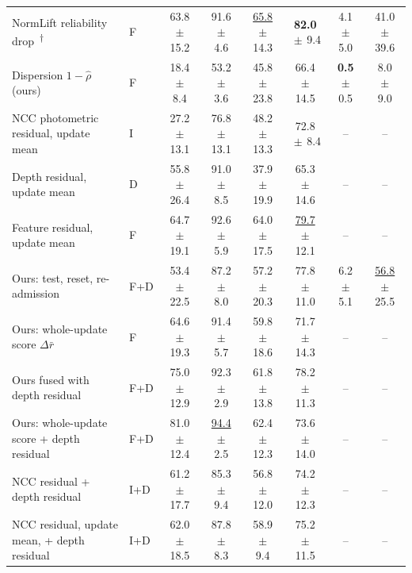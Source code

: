 \documentclass[journal]{IEEEtran}
\newcommand{\reimpl}{\textsuperscript{$\dagger$}}   %
\begin{document}
\begin{table}[t]
\begin{tabular}{@{}llcccccc@{}}
NormLift reliability drop~\cite{zang2026normlift}\reimpl & F & 63.8{\scriptsize$\,\pm\,$15.2} & 91.6{\scriptsize$\,\pm\,$4.6} & \underline{65.8}{\scriptsize$\,\pm\,$14.3} & \textbf{82.0}{\scriptsize$\,\pm\,$9.4} & 4.1{\scriptsize$\,\pm\,$5.0} & 41.0{\scriptsize$\,\pm\,$39.6}\\
Dispersion $1-\hat\rho$ (ours) & F & 18.4{\scriptsize$\,\pm\,$8.4} & 53.2{\scriptsize$\,\pm\,$3.6} & 45.8{\scriptsize$\,\pm\,$23.8} & 66.4{\scriptsize$\,\pm\,$14.5} & \textbf{0.5}{\scriptsize$\,\pm\,$0.5} & 8.0{\scriptsize$\,\pm\,$9.0}\\
\midrule
NCC photometric residual, update mean & I & 27.2{\scriptsize$\,\pm\,$13.1} & 76.8{\scriptsize$\,\pm\,$13.1} & 48.2{\scriptsize$\,\pm\,$13.3} & 72.8{\scriptsize$\,\pm\,$8.4} & -- & --\\
Depth residual, update mean & D & 55.8{\scriptsize$\,\pm\,$26.4} & 91.0{\scriptsize$\,\pm\,$8.5} & 37.9{\scriptsize$\,\pm\,$19.9} & 65.3{\scriptsize$\,\pm\,$14.6} & -- & --\\
Feature residual, update mean & F & 64.7{\scriptsize$\,\pm\,$19.1} & 92.6{\scriptsize$\,\pm\,$5.9} & 64.0{\scriptsize$\,\pm\,$17.5} & \underline{79.7}{\scriptsize$\,\pm\,$12.1} & -- & --\\
\midrule
Ours: test, reset, re-admission & F+D & 53.4{\scriptsize$\,\pm\,$22.5} & 87.2{\scriptsize$\,\pm\,$8.0} & 57.2{\scriptsize$\,\pm\,$20.3} & 77.8{\scriptsize$\,\pm\,$11.0} & 6.2{\scriptsize$\,\pm\,$5.1} & \underline{56.8}{\scriptsize$\,\pm\,$25.5}\\
Ours: whole-update score $\Delta\bar r$ & F & 64.6{\scriptsize$\,\pm\,$19.3} & 91.4{\scriptsize$\,\pm\,$5.7} & 59.8{\scriptsize$\,\pm\,$18.6} & 71.7{\scriptsize$\,\pm\,$14.3} & -- & --\\
\midrule
Ours fused with depth residual & F+D & 75.0{\scriptsize$\,\pm\,$12.9} & 92.3{\scriptsize$\,\pm\,$2.9} & 61.8{\scriptsize$\,\pm\,$13.8} & 78.2{\scriptsize$\,\pm\,$11.3} & -- & --\\
Ours: whole-update score + depth residual & F+D & 81.0{\scriptsize$\,\pm\,$12.4} & \underline{94.4}{\scriptsize$\,\pm\,$2.5} & 62.4{\scriptsize$\,\pm\,$12.3} & 73.6{\scriptsize$\,\pm\,$14.0} & -- & --\\
NCC residual + depth residual & I+D & 61.2{\scriptsize$\,\pm\,$17.7} & 85.3{\scriptsize$\,\pm\,$9.4} & 56.8{\scriptsize$\,\pm\,$12.0} & 74.2{\scriptsize$\,\pm\,$12.3} & -- & --\\
NCC residual, update mean, + depth residual & I+D & 62.0{\scriptsize$\,\pm\,$18.5} & 87.8{\scriptsize$\,\pm\,$8.3} & 58.9{\scriptsize$\,\pm\,$9.4} & 75.2{\scriptsize$\,\pm\,$11.5} & -- & --\\

\end{tabular}
\end{table}
\end{document}
